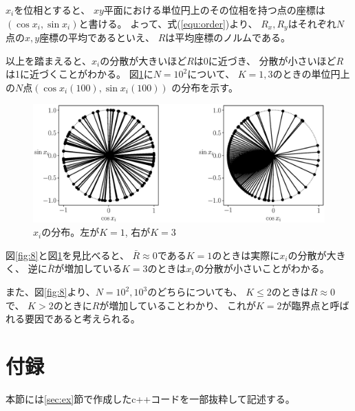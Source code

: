 \documentclass[a4j, titlepage]{jsarticle}
\numberwithin{equation}{section}
\begin{document}
            $x_i$を位相とすると、
            $xy$平面における単位円上のその位相を持つ点の座標は$(\cos x_i, \sin x_i)$と書ける。
            よって、式(\ref{equ:order})より、
            $R_x, R_y$はそれぞれ$N$点の$x, y$座標の平均であるといえ、
            $R$は平均座標のノルムである。

            以上を踏まえると、$x_i$の分散が大きいほど$R$は0に近づき、
            分散が小さいほど$R$は1に近づくことがわかる。
            図\ref{fig:k}に$N=10^2$について、
            $K=1, 3$のときの単位円上の$N$点$(\cos x_i(100), \sin x_i(100))$
            の分布を示す。
            \begin{figure}[h]
                \centering
                \includegraphics[width=1\hsize]{kadai8/k.eps}
                \caption{
                    $x_i$の分布。左が$K=1$, 右が$K=3$
                }
                \label{fig:k}
            \end{figure}
            図\ref{fig:8}と図\ref{fig:k}を見比べると、
            $\bar{R}\approx 0$である$K=1$のときは実際に$x_i$の分散が大きく、
            逆に$\bar{R}$が増加している$K=3$のときは$x_i$の分散が小さいことがわかる。

            また、図\ref{fig:8}より、$N = 10^2, 10^3$のどちらについても、
            $K \leq 2$のときは$R\approx 0$で、
            $K > 2$のときに$R$が増加していることわかり、
            これが$K = 2$が臨界点と呼ばれる要因であると考えられる。

\section{付録}
    本節には\ref{sec:ex}節で作成したc++コードを一部抜粋して記述する。
\end{document}
